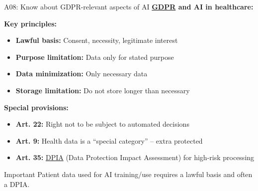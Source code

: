 \documentclass[aspectratio=169, 10pt]{beamer}
\begin{document}
\begin{frame}{A08: Know about GDPR-relevant aspects of AI}
    \textbf{\href{https://gdpr.eu/}{GDPR} and AI in healthcare:}
    
    \vspace{0.3cm}
    \textbf{Key principles:}
    \begin{itemize}
        \item \textbf{Lawful basis:} Consent, necessity, legitimate interest
        \item \textbf{Purpose limitation:} Data only for stated purpose
        \item \textbf{Data minimization:} Only necessary data
        \item \textbf{Storage limitation:} Do not store longer than necessary
    \end{itemize}
    
    \vspace{0.3cm}
    \textbf{Special provisions:}
    \begin{itemize}
        \item \textbf{Art. 22:} Right not to be subject to automated decisions
        \item \textbf{Art. 9:} Health data is a ``special category'' -- extra protected
        \item \textbf{Art. 35:} \href{https://gdpr.eu/data-protection-impact-assessment-template/}{DPIA} (Data Protection Impact Assessment) for high-risk processing
    \end{itemize}
    
    \vspace{0.3cm}
    \begin{alertblock}{Important}
        Patient data used for AI training/use requires a lawful basis and often a DPIA.
    \end{alertblock}
\end{frame}
\end{document}
